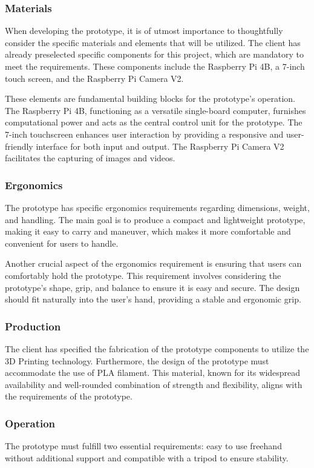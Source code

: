 \subsubsection{Materials}
When developing the prototype, it is of utmost importance to thoughtfully consider the specific materials and elements that will be utilized. The client has already preselected specific components for this project, which are mandatory to meet the requirements. These components include the Raspberry Pi 4B, a 7-inch touch screen, and the Raspberry Pi Camera V2.

These elements are fundamental building blocks for the prototype's operation. The Raspberry Pi 4B, functioning as a versatile single-board computer, furnishes computational power and acts as the central control unit for the prototype. The 7-inch touchscreen enhances user interaction by providing a responsive and user-friendly interface for both input and output. The Raspberry Pi Camera V2 facilitates the capturing of images and videos.

\subsubsection{Ergonomics}
The prototype has specific ergonomics requirements regarding dimensions, weight, and handling. The main goal is to produce a compact and lightweight prototype, making it easy to carry and maneuver, which makes it more comfortable and convenient for users to handle.

Another crucial aspect of the ergonomics requirement is ensuring that users can comfortably hold the prototype. This requirement involves considering the prototype's shape, grip, and balance to ensure it is easy and secure. The design should fit naturally into the user's hand, providing a stable and ergonomic grip.

\subsubsection{Production}
The client has specified the fabrication of the prototype components to utilize the 3D Printing technology. Furthermore, the design of the prototype must accommodate the use of PLA filament. This material, known for its widespread availability and well-rounded combination of strength and flexibility, aligns with the requirements of the prototype.

\subsubsection{Operation}
The prototype must fulfill two essential requirements: easy to use freehand without additional support and compatible with a tripod to ensure stability.

